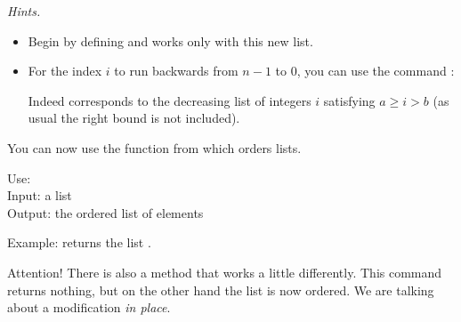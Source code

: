 \documentclass[11pt,class=report,crop=false]{standalone}
\begin{document}
\begin{activite}
\medskip

\emph{Hints.}
\begin{itemize}
  \item Begin by defining  and works only with this new list.
  \item For the index $i$ to run backwards from $n-1$ to $0$, you can use the command : 

Indeed  corresponds to the decreasing list of integers $i$ satisfying $a \ge i > b$ (as usual the right bound is not included).
\end{itemize}

\end{activite}


\begin{cours}[Sorting]

You can now use the  function from \Python{} which orders lists.

 
  \begin{fonctionpython}
    Use: \\
    Input: a list \\
    Output: the ordered list of elements
  
  \medskip
     
   Example:  returns the list \ci{[4,6,6,7,8,11,12,13]}.

  \end{fonctionpython}  
  
  Attention! There is also a  method that works a little differently. This command returns nothing, but on the other hand the list  is now ordered. We are talking about a modification \emph{in place}.
\end{cours}


\end{document}
